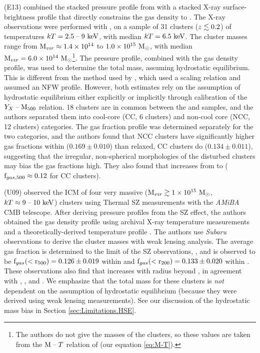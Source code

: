 \textbf{\citet{Eckert2013b}} (E13) combined the stacked pressure
profile from \citet{PlanckIntV} with a stacked X-ray
surface-brightness profile that directly constrains the gas density to
\rtwo{}. The X-ray observations were performed with \Rosat{}, on a
sample of 31 clusters ($z\lesssim0.2$) of temperatures $kT =
2.5\;\textrm{--}\;9~\textrm{keV}$, with median $kT = 6.5~\textrm{keV}$. The cluster masses range
from $\textrm{M\ensuremath{_{vir}}} \approx 1.4 \times 10^{14}$ to $1.0 \times 10^{15}~\textrm{M}_\odot$, with
median $\textrm{M\ensuremath{_{vir}}} = 6.0\times 10^{14}~\textrm{M}_\odot$\footnote{The authors do not give
  the masses of the clusters, so these values are taken from the
  $\textrm{M}{}\;\textrm{--}\;{}T$ relation of \citet{Vikhlinin2006} (our equation
  \ref{eq:M-T}).}. The \Planck{} pressure profile, combined with the
gas density profile, was used to determine the total mass, assuming
hydrostatic equilibrium. This is different from the method used by
\citet{PlanckIntV}, which used a scaling relation and assumed an NFW
profile. However, both estimates rely on the assumption of hydrostatic
equilibrium either explicitly or implicitly through calibration of the
$Y_X\;\textrm{--}\;\textrm{M\ensuremath{_{500}}}$ relation. 18 clusters are in common
between the \Rosat{} and \Planck{} samples, and the authors separated
them into cool-core (CC, 6 clusters) and non-cool core (NCC, 12
clusters) categories. The gas fraction profile was determined
separately for the two categories, and the authors found that NCC
clusters have significantly higher gas fractions within \rtwo{}
($0.169 \pm 0.010$) than relaxed, CC clusters do ($0.134\pm 0.011$),
suggesting that the irregular, non-spherical morphologies of the
disturbed clusters may bias the gas fractions high. They also found
that \fg{} increases from \rfive{} to \rtwo{} ($\textrm{f\ensuremath{_{gas,500}}} \approx
0.12$ for CC clusters).

\textbf{\citet{Umetsu2009}} (U09) observed the ICM of four very
massive ($\textrm{M\ensuremath{_{vir}}} \gtrsim 1\times 10^{15}~\textrm{M}_\odot$, $kT \approx 9\;\textrm{--}\;10~\textrm{keV}$)
clusters using Thermal SZ measurements with the \textit{AMiBA} CMB
telescope. After deriving pressure profiles from the SZ effect, the
authors obtained the gas density profile using archival X-ray
temperature measurements and a theoretically-derived temperature
profile \citep{Komatsu2001}. The authors use \textit{Subaru}
observations to derive the cluster masses with weak lensing
analysis. The average gas fraction is determined to the limit of the
SZ observations, \rtwo, and is observed to be $\textrm{f\ensuremath{_{gas}}}(<\textrm{r\ensuremath{_{500}}}) = 0.126
\pm 0.019$ within \rfive{} and $\textrm{f\ensuremath{_{gas}}}(<\textrm{r\ensuremath{_{200}}}) = 0.133 \pm 0.020$ within
\rtwo{}. These observations also find that \fg{} increases with radius
beyond \rfive{}, in agreement with \citet{Rasheed2011},
\citet{PlanckIntV}, and \citet{Eckert2013b}. We emphasize that the
total mass for these clusters is \textit{not} dependent on the
assumption of hydrostatic equilibrium (because they were derived using
weak lensing measurements). See our discussion of the hydrostatic mass
bias in Section \ref{sec:Limitations.HSE}.

